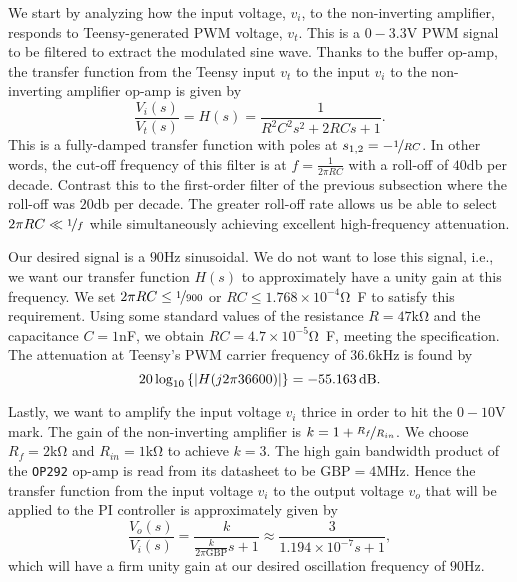 We start by analyzing how the input voltage, $v_i$, to the non-inverting
amplifier, responds to Teensy-generated PWM voltage, $v_t$. This is a
$0-3.3$\unit{\volt} PWM signal to be filtered to extract the modulated sine
wave. Thanks to the buffer op-amp, the transfer function from the Teensy input
$v_t$ to the input $v_i$ to the non-inverting amplifier op-amp is given by
%
\begin{equation}
\frac{V_i(s)}{V_t(s)} = H(s) = \frac{1}{R^2C^2s^2+2RCs+1}.
\label{eq:tf}
\end{equation}
%
This is a fully-damped transfer function with poles at $s_{1,2} =
-\nicefrac{1}{RC}$. In other words, the cut-off frequency of this filter is at
$f = \frac{1}{2\pi RC}$ with a roll-off of $40$\unit{\decibel} per decade.
Contrast this to the first-order filter of the previous subsection where the
roll-off was $20$\unit{\decibel} per decade. The greater roll-off rate allows us
be able to select $2\pi RC \ll \nicefrac{1}{f}$ while simultaneously achieving
excellent high-frequency attenuation.

Our desired signal is a $90$\unit{\hertz} sinusoidal. We do not want to lose
this signal, i.e., we want our transfer function $H(s)$ to approximately have a
unity gain at this frequency. We set $2\pi RC \leq \nicefrac{1}{900}$ or $RC
\leq 1.768 \times 10^{-4}$\unit{\ohm\farad} to satisfy this requirement. Using
some standard values of the resistance $R = 47$\unit{\kilo\ohm} and the
capacitance $C = 1$\unit{\nano\farad}, we obtain $RC = 4.7 \times
10^{-5}$\unit{\ohm\farad}, meeting the specification. The attenuation at
Teensy's PWM carrier frequency of $36.6$\unit{\kilo\hertz} is found by \[ 20
\log_{10}\left\{\abs{H(j 2\pi 36600)}\right\} = -55.163\,\unit{\decibel}. \]

Lastly, we want to amplify the input voltage $v_i$ thrice in order to hit the
$0-10$\unit{\volt} mark. The gain of the non-inverting amplifier is $k = 1 +
\nicefrac{R_f}{R_{in}}$. We choose $R_f = 2$\unit{\kilo\ohm} and $R_{in} =
1$\unit{\kilo\ohm} to achieve $k = 3$. The high gain bandwidth product of the
\texttt{OP292} op-amp is read from its datasheet to be $\text{GBP} =
4$\unit{\mega\hertz}. Hence the transfer function from the input voltage $v_i$
to the output voltage $v_o$ that will be applied to the PI controller is
approximately given by \[ \frac{V_o(s)}{V_i(s)} =
\frac{k}{\frac{k}{2\pi\text{GBP}}s + 1} \approx \frac{3}{1.194\times 10^{-7}s +
1}, \] which will have a firm unity gain at our desired oscillation frequency of
$90$\unit{\hertz}.


